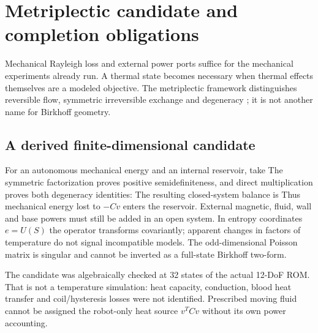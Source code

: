 \PaperPage
\section{Metriplectic candidate and completion obligations}
Mechanical Rayleigh loss and external power ports suffice for the mechanical experiments already run. A thermal state becomes necessary when thermal effects themselves are a modeled objective. The metriplectic framework distinguishes reversible flow, symmetric irreversible exchange and degeneracy \citep{coquinot2020}; it is not another name for Birkhoff geometry.

\subsection{A derived finite-dimensional candidate}
For an autonomous mechanical energy and an internal reservoir, take
\EqThermalState
\EqMetriplecticMatrices
The symmetric factorization proves positive semidefiniteness, and direct multiplication proves both degeneracy identities:
\EqDegeneracy
The resulting closed-system balance is
\EqThermalBalance
Thus mechanical energy lost to $-Cv$ enters the reservoir. External magnetic, fluid, wall and base powers must still be added in an open system. In entropy coordinates $e=U(S)$ the operator transforms covariantly; apparent changes in factors of temperature do not signal incompatible models. The odd-dimensional Poisson matrix is singular and cannot be inverted as a full-state Birkhoff two-form.

The candidate was algebraically checked at 32 states of the actual 12-DoF ROM. That is not a temperature simulation: heat capacity, conduction, blood heat transfer and coil/hysteresis losses were not identified. Prescribed moving fluid cannot be assigned the robot-only heat source $v^TCv$ without its own power accounting.

